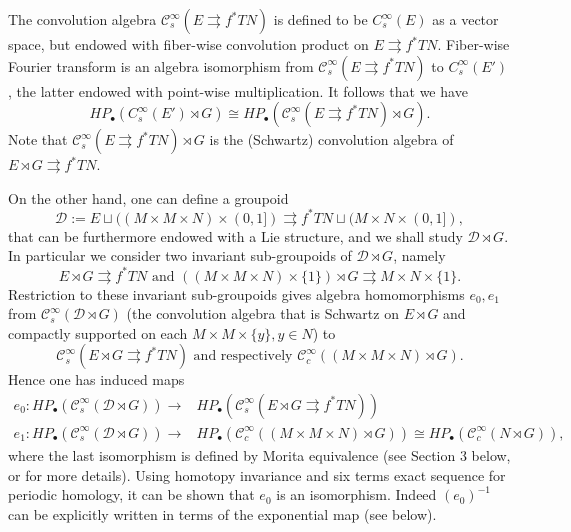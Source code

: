 \documentclass[a4paper]{amsart}
\newcommand{\maC}{\mathcal C}
\newcommand{\maD}{\mathcal D}
\newcommand\<{\langle}
\renewcommand\>{\rangle}
\theoremstyle{definition}
\theoremstyle{remark}
\begin{document}
The convolution algebra $\maC^\infty _s (E \rightrightarrows f^* T N)$ is defined to be $C^\infty _s (E)$ as a vector space,
but endowed with fiber-wise convolution product on $E \rightrightarrows f^* T N$.
Fiber-wise Fourier transform is an algebra isomorphism from $\maC^\infty _s (E \rightrightarrows f^* T N)$ to $C^\infty _s (E')$,
the latter endowed with point-wise multiplication.
It follows that we have
$$ H P _\bullet (C^\infty _s (E') \rtimes G)  \cong H P _\bullet ( \maC^\infty_s (E \rightrightarrows f^* T N) \rtimes G) .$$
Note that $\maC^\infty _s (E \rightrightarrows f^* T N) \rtimes G$ is the (Schwartz) convolution algebra of
$E \rtimes G \rightrightarrows f^* T N$.

On the other hand, one can define a groupoid
$$ \maD := E \sqcup ((M \times M \times N) \times (0, 1]) \rightrightarrows f^* T N \sqcup (M \times N \times (0, 1]),$$
that can be furthermore endowed with a Lie structure,
and we shall study $\maD \rtimes G$.
In particular we consider two invariant sub-groupoids of $\maD \rtimes G$, namely
$$ E \rtimes G \rightrightarrows f ^* T N
\text{ and } ((M \times M \times N) \times \{1\}) \rtimes G \rightrightarrows M \times N \times \{ 1 \} .$$
Restriction to these invariant sub-groupoids gives algebra homomorphisms $e _0 , e _1$ from
$\maC^\infty _s (\maD \rtimes G)$ (the convolution algebra that is Schwartz on $E \rtimes G$ and compactly supported on each
$M \times M \times \{ y \}, y \in N$) to
$$ \maC^\infty _s (E \rtimes G \rightrightarrows f ^* T N) \text{ and respectively }
 \maC^\infty _c ((M \times M \times N) \rtimes G) .$$
Hence one has induced maps
\begin{align*}
e_0 : H P _\bullet (\maC^\infty _s (\maD \rtimes G)) \to & H P _\bullet (\maC^\infty _s (E \rtimes G \rightrightarrows f ^* T N)) \\
e_1 : H P _\bullet (\maC^\infty _s (\maD \rtimes G)) \to & H P _\bullet (\maC^\infty _c ((M \times M \times N) \rtimes G))
\cong H P _\bullet (\maC^\infty _c (N \rtimes G)),
\end{align*}
where the last isomorphism is defined by Morita equivalence (see Section 3 below, or \cite{CRWW23} for more details).
Using homotopy invariance and six terms exact sequence for periodic homology,
it can be shown that $e_0$ is an isomorphism.
Indeed $(e_0)^{-1}$ can be explicitly written in terms of the exponential map (see below).
\end{document}
